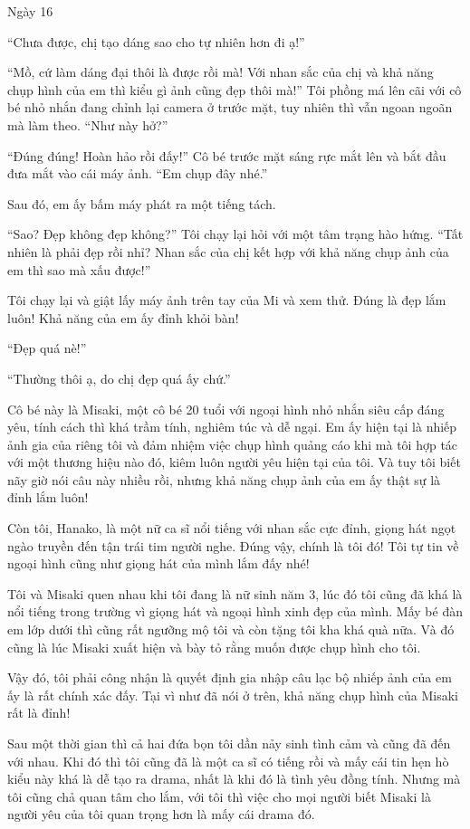 {Ngày 16}
{
``Chưa được, chị tạo dáng sao cho tự nhiên hơn đi ạ!''

``Mồ, cứ làm dáng đại thôi là được rồi mà! Với nhan sắc của chị và khả
năng chụp hình của em thì kiểu gì ảnh cũng đẹp thôi mà!'' Tôi phồng má
lên cãi với cô bé nhỏ nhắn đang chỉnh lại camera ở trước mặt, tuy nhiên
thì vẫn ngoan ngoãn mà làm theo. ``Như này hở?''

``Đúng đúng! Hoàn hảo rồi đấy!'' Cô bé trước mặt sáng rực mắt lên và bắt
đầu đưa mắt vào cái máy ảnh. ``Em chụp đây nhé.''

Sau đó, em ấy bấm máy phát ra một tiếng tách.

``Sao? Đẹp không đẹp không?'' Tôi chạy lại hỏi với một tâm trạng hào
hứng. ``Tất nhiên là phải đẹp rồi nhỉ? Nhan sắc của chị kết hợp với khả
năng chụp ảnh của em thì sao mà xấu được!''

Tôi chạy lại và giật lấy máy ảnh trên tay của Mi và xem thử. Đúng là đẹp
lắm luôn! Khả năng của em ấy đỉnh khỏi bàn!

``Đẹp quá nè!''

``Thường thôi ạ, do chị đẹp quá ấy chứ.''

Cô bé này là Misaki, một cô bé 20 tuổi với ngoại hình nhỏ nhắn siêu cấp
đáng yêu, tính cách thì khá trầm tính, nghiêm túc và dễ ngại. Em ấy hiện
tại là nhiếp ảnh gia của riêng tôi và đảm nhiệm việc chụp hình quảng cáo
khi mà tôi hợp tác với một thương hiệu nào đó, kiêm luôn người yêu hiện
tại của tôi. Và tuy tôi biết nãy giờ nói câu này nhiều rồi, nhưng khả
năng chụp ảnh của em ấy thật sự là đỉnh lắm luôn!

Còn tôi, Hanako, là một nữ ca sĩ nổi tiếng với nhan sắc cực đỉnh, giọng
hát ngọt ngào truyền đến tận trái tim người nghe. Đúng vậy, chính là tôi
đó! Tôi tự tin về ngoại hình cũng như giọng hát của mình lắm đấy nhé!

Tôi và Misaki quen nhau khi tôi đang là nữ sinh năm 3, lúc đó tôi cũng
đã khá là nổi tiếng trong trường vì giọng hát và ngoại hình xinh đẹp của
mình. Mấy bé đàn em lớp dưới thì cũng rất ngưỡng mộ tôi và còn tặng tôi
kha khá quà nữa. Và đó cũng là lúc Misaki xuất hiện và bày tỏ rằng muốn
được chụp hình cho tôi.

Vậy đó, tôi phải công nhận là quyết định gia nhập câu lạc bộ nhiếp ảnh
của em ấy là rất chính xác đấy. Tại vì như đã nói ở trên, khả năng chụp
hình của Misaki rất là đỉnh!

Sau một thời gian thì cả hai đứa bọn tôi dần nảy sinh tình cảm và cũng
đã đến với nhau. Khi đó thì tôi cũng đã là một ca sĩ có tiếng rồi và mấy
cái tin hẹn hò kiểu này khá là dễ tạo ra drama, nhất là khi đó là tình
yêu đồng tính. Nhưng mà tôi cũng chả quan tâm cho lắm, với tôi thì việc
cho mọi người biết Misaki là người yêu của tôi quan trọng hơn là mấy cái
drama đó.

}
